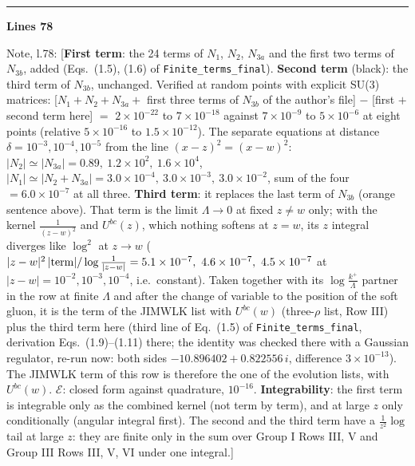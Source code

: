 \documentclass[10pt]{article}
\newenvironment{notebox}{\def\FrameCommand{{\color{notebar}\vrule width 1.5pt}\hspace{6pt}}\MakeFramed{\advance\hsize-\width\FrameRestore}\small}{\endMakeFramed}
\begin{document}
\par
\noindent{\small\textsf{Unmarked edit, l.70 (deleted):} \texttt{\textbackslash{}\allowbreak{}rho\^{}\{b'\}\allowbreak{}(x')\allowbreak{}\textbackslash{}\allowbreak{}right]\textbackslash{}\allowbreak{}times}}\par
\noindent{\small\textsf{Unmarked edit, l.70 (deleted):} \texttt{\textbackslash{}\allowbreak{}left[U\^{}\{de\}\allowbreak{}(x)\allowbreak{}\textbackslash{}\allowbreak{},\allowbreak{}U\^{}\{bc\}\allowbreak{}(z)\allowbreak{}\textbackslash{}\allowbreak{},\allowbreak{}}}\par
{}\noindent\rule{\linewidth}{0.3pt}\par\noindent\textbf{Lines 78}\par
\begin{notebox}\textsf{\small Note, l.78:} [\textbf{First term}: the 24 terms of $N_{1}$, $N_{2}$, $N_{3a}$ and the first two terms of $N_{3b}$, added (Eqs.~(1.5), (1.6) of \texttt{Finite\_terms\_final}). \textbf{Second term} (black): the third term of $N_{3b}$, unchanged. Verified at random points with explicit SU(3) matrices: [$N_{1}+N_{2}+N_{3a}+$ first three terms of $N_{3b}$ of the author's file] $-$ [first $+$ second term here] $=$ $2\times10^{-22}$ to $7\times10^{-18}$ against $7\times10^{-9}$ to $5\times10^{-6}$ at eight points (relative $5\times10^{-16}$ to $1.5\times10^{-12}$). The separate equations at distance $\delta=10^{-3},10^{-4},10^{-5}$ from the line $(x-z)^{2}=(x-w)^{2}$: $|N_{2}|\simeq|N_{3a}|=0.89,\ 1.2\times10^{2},\ 1.6\times10^{4}$, $|N_{1}|\simeq|N_{2}+N_{3a}|=3.0\times10^{-4},\ 3.0\times10^{-3},\ 3.0\times10^{-2}$, sum of the four $=6.0\times10^{-7}$ at all three. \textbf{Third term}: it replaces the last term of $N_{3b}$ (orange sentence above). That term is the limit $\Lambda\to0$ at fixed $z\neq w$ only; with the kernel $\frac{1}{(z-w)^{2}}$ and $U^{bc}(z)$, which nothing softens at $z=w$, its $z$ integral diverges like $\log^{2}$ at $z\to w$ ($|z-w|^{2}\,|{\rm term}|/\log\frac{1}{|z-w|}=5.1\times10^{-7},\ 4.6\times10^{-7},\ 4.5\times10^{-7}$ at $|z-w|=10^{-2},10^{-3},10^{-4}$, i.e.\ constant). Taken together with its $\log\frac{k^{+}}{\Lambda}$ partner in the row at finite $\Lambda$ and after the change of variable to the position of the soft gluon, it is the term of the JIMWLK list with $U^{bc}(w)$ (three-$\rho$ list, Row III) plus the third term here (third line of Eq.~(1.5) of \texttt{Finite\_terms\_final}, derivation Eqs.~(1.9)--(1.11) there; the identity was checked there with a Gaussian regulator, re-run now: both sides $-10.896402+0.822556\,i$, difference $3\times10^{-13}$). The JIMWLK term of this row is therefore the one of the evolution lists, with $U^{bc}(w)$. $\mathcal{E}$: closed form against quadrature, $10^{-16}$. \textbf{Integrability}: the first term is integrable only as the combined kernel (not term by term), and at large $z$ only conditionally (angular integral first). The second and the third term have a $\frac{1}{z^{2}}\log$ tail at large $z$: they are finite only in the sum over Group I Rows III, V and Group III Rows III, V, VI under one integral.]\end{notebox}
\end{document}
